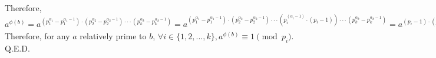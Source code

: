 \documentclass{article}
\begin{document}
\indent Therefore, $a^{\phi(b)} = a^{(p_1^{\alpha_1} - p_1^{\alpha_1 - 1})\cdot (p_2^{\alpha_2} - p_2^{\alpha_2 - 1})\cdot\cdot\cdot (p_k^{\alpha_k} - p_k^{\alpha_k - 1})} = a^{(p_1^{\alpha_1} - p_1^{\alpha_1 - 1})\cdot (p_2^{\alpha_2} - p_2^{\alpha_2 - 1})\cdot\cdot\cdot (p_i^{(\alpha_i - 1)}\cdot (p_i - 1))\cdot\cdot\cdot (p_k^{\alpha_k} - p_k^{\alpha_k - 1})} = a^{(p_i - 1)\cdot(p_1^{\alpha_1} - p_1^{\alpha_1 - 1})\cdot (p_2^{\alpha_2} - p_2^{\alpha_2 - 1})\cdot\cdot\cdot p_i^{(\alpha_i - 1)}\cdot\cdot\cdot (p_k^{\alpha_k} - p_k^{\alpha_k - 1})}\equiv1^{(p_1^{\alpha_1} - p_1^{\alpha_1 - 1})\cdot\cdot\cdot p_i^{(\alpha_i - 1)}\cdot\cdot\cdot (p_k^{\alpha_k} - p_k^{\alpha_k - 1})}\equiv1\pmod{p_i}.$ \\[.1cm]
\indent Therefore, for any $a$ relatively prime to $b$, $\forall i\in\{1, 2, ..., k\}, a^{\phi(b)}\equiv1\pmod{p_i}$. \\[.1cm]
\indent Q.E.D.
\end{document}
